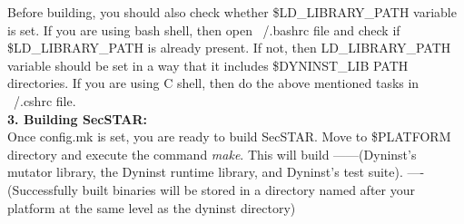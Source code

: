 Before building, you should also check whether \$LD\_LIBRARY\_PATH variable is set. If you are using bash shell, then open ~/.bashrc file and check if \$LD\_LIBRARY\_PATH is already present. If not, then LD\_LIBRARY\_PATH variable should be set in a way that it includes  \${DYNINST\_LIB PATH} directories.  If you are using C shell, then do the above mentioned tasks in ~/.cshrc file. \\
 
\textbf{3. Building SecSTAR:} \\
Once config.mk is set, you are ready to build SecSTAR. Move to \$PLATFORM directory  and execute the command \textit{make}. This will build ------(Dyninst’s mutator library, the Dyninst runtime library, and Dyninst’s test suite). ---- (Successfully built binaries will be stored in a directory named after your platform at the same level as the dyninst directory) \\

